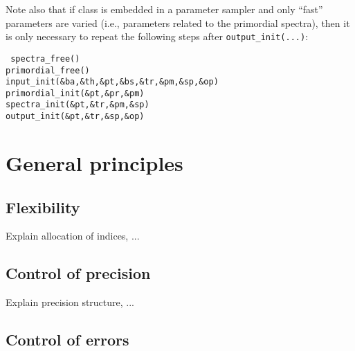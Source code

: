 \documentclass{article}
\begin{document}
Note also that if {\sc class} is embedded in a
parameter sampler and only ``fast'' parameters are varied (i.e.,
parameters related to the primordial spectra), then it is only
necessary to repeat the following steps after {\tt output\_init(...)}:

\vspace{0.5cm}

{\tt 
\indent  spectra\_free()\\
\indent  primordial\_free()\\
\indent  input\_init(\&ba,\&th,\&pt,\&bs,\&tr,\&pm,\&sp,\&op)\\
\indent  primordial\_init(\&pt,\&pr,\&pm)\\
\indent  spectra\_init(\&pt,\&tr,\&pm,\&sp)\\
\indent  output\_init(\&pt,\&tr,\&sp,\&op)\\
}

\section{General principles}

\subsection{Flexibility}

Explain allocation of indices, ...

\subsection{Control of precision}

Explain precision structure, ...

\subsection{Control of errors}
\end{document}
